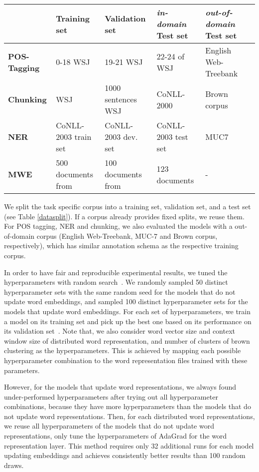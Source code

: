 \begin{table*}
\caption{Datasets splits and feature space for each sequence tagging task.}
\begin{small}
\begin{tabular}{lllp{}ll}
\hline
			& \textbf{Training set} & \textbf{Validation set} & \textbf{\textit{in-domain} Test set} & \textbf{\textit{out-of-domain} Test set} \\ \hline
\textbf{POS-Tagging} & 0-18 WSJ & 19-21 WSJ & 22-24 of WSJ & English Web-Treebank  \\
\textbf{Chunking} & WSJ & 1000 sentences WSJ & CoNLL-2000 & Brown corpus \\
\textbf{NER} & CoNLL-2003 train set & CoNLL-2003 dev. set & CoNLL-2003 test set & MUC7  \\
\textbf{MWE} & 500 documents from & 100 documents from & 123 documents & - \\
\hline
\end{tabular}
\label{datasplit}
\end{small}
\end{table*}

We split the task specific corpus into a training set, validation set, and a test set (see Table \ref{datasplit}). If a corpus already provides fixed splits, we reuse them. For POS tagging,  NER and chunking, we also evaluated the models with a out-of-domain corpus (English Web-Treebank, MUC-7 and Brown corpus, respectively), which has similar annotation schema as the respective training corpus.

In order to have fair and reproducible experimental results, we tuned the hyperparameters with random search~\cite{bergstra2012random}. 
We randomly sampled 50 distinct hyperparameter sets with the same random seed for the models that do not update word embeddings, and sampled 100 distinct hyperparameter sets for the models that update word embeddings. 
For each set of hyperparameters, we train a model on its training set and pick up the best one based on its performance on its validation set~\cite{turian2010word}. 
Note that, we also consider word vector size and context window size of distributed word representation, and number of clusters of brown clustering as the hyperparameters.
This is achieved by mapping each possible hyperparameter combination to the word representation files trained with these parameters. 

However, for the models that update word representations, we always found under-performed hyperparameters after trying out all hyperparameter combinations, because they have more hyperparameters than the models that do not update word representations. Then, for each distributed word representations, we reuse all hyperparameters of the models that do not update word representations, only tune the hyperparameters of AdaGrad for the word representation layer. This method requires only 32 additional runs for each model updating embeddings and achieves consistently better results than 100 random draws.

